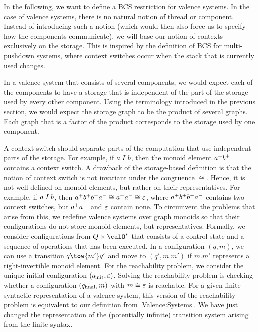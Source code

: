 \documentclass[../../diss.tex]{subfiles}
\begin{document}
In the following, we want to define a BCS restriction for valence systems.
In the case of valence systems, there is no natural notion of thread or component.
Instead of introducing such a notion (which would then also force us to specify how the components communicate), we will base our notion of contexts exclusively on the storage.
This is inspired by the definition of BCS for multi-pushdown systems, where context switches occur when the stack that is currently used changes.

In a valence system that consists of several components, we would expect each of the components to have a storage that is independent of the part of the storage used by every other component.
Using the terminology introduced in the previous section, we would expect the storage graph to be the product of several graphs.
Each graph that is a factor of the product corresponds to the storage used by one component.

A context switch should separate parts of the computation that use independent parts of the storage.
For example, if $a \mathrel{I} b$, then the monoid element ${a}^+{b}^+$ contains a context switch.
A drawback of the storage-based definition is that the notion of context switch is not invariant under the congruence $\cong$.
Hence, it is not well-defined on monoid elements, but rather on their representatives.
For example, if $a \mathrel{I} b$, then ${a}^+{b}^+{b}^-{a}^- \cong {a}^+{a}^- \cong \varepsilon$, where ${a}^+{b}^+{b}^-{a}^-$ contains two context switches, but ${a}^+{a}^-$ and $\varepsilon$ contain none.
To circumvent the problems that arise from this, we redefine valence systems over graph monoids so that their configurations do not store monoid elements, but representatives.
Formally, we consider configurations from $Q \times \ops^*$ that consists of a control state and a sequence of operations that has been executed.
In a configuration $(q,m)$, we can use a transition $q \tow{m'} q'$ and move to $(q',m.m')$ if $m.m'$ represents a right-invertible monoid element.
For the reachability problem, we consider the unique initial configuration $(q_{\text{init}},\varepsilon)$.
Solving the reachability problem is checking whether a configuration $(q_{\text{final}},m)$ with $m \cong \varepsilon$ is reachable.
For a given finite syntactic representation of a valence system, this version of the reachability problem is equivalent to our definition from \cref{Valence:Systems}.
We have just changed the representation of the (potentially infinite) transition system arising from the finite syntax.
\end{document}
